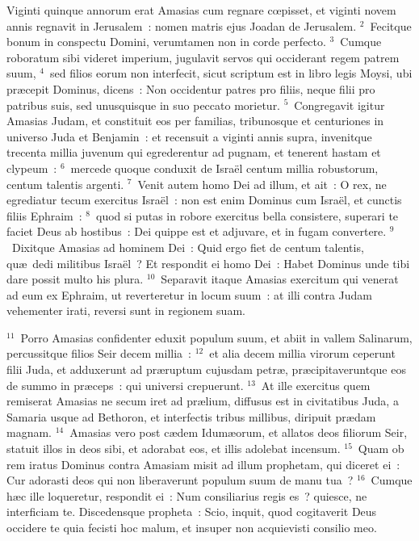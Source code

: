 \bchapter
\lettrine[lines=3,image=true,loversize=0.05,lraise=-0.03]{V}{}iginti quinque annorum erat Amasias cum regnare cœpisset, et viginti novem annis regnavit in Jerusalem~: nomen matris ejus Joadan de Jerusalem.
${}^{2}$~Fecitque bonum in conspectu Domini, verumtamen non in corde perfecto.
${}^{3}$~Cumque roboratum sibi videret imperium, jugulavit servos qui occiderant regem patrem suum,
${}^{4}$~sed filios eorum non interfecit, sicut scriptum est in libro legis Moysi, ubi pr\ae cepit Dominus, dicens~: Non occidentur patres pro filiis, neque filii pro patribus suis, sed unusquisque in suo peccato morietur.
${}^{5}$~Congregavit igitur Amasias Judam, et constituit eos per familias, tribunosque et centuriones in universo Juda et Benjamin~: et recensuit a viginti annis supra, invenitque trecenta millia juvenum qui egrederentur ad pugnam, et tenerent hastam et clypeum~:
${}^{6}$~mercede quoque conduxit de Isra\"el centum millia robustorum, centum talentis argenti.
${}^{7}$~Venit autem homo Dei ad illum, et ait~: O rex, ne egrediatur tecum exercitus Isra\"el~: non est enim Dominus cum Isra\"el, et cunctis filiis Ephraim~:
${}^{8}$~quod si putas in robore exercitus bella consistere, superari te faciet Deus ab hostibus~: Dei quippe est et adjuvare, et in fugam convertere.
${}^{9}$~Dixitque Amasias ad hominem Dei~: Quid ergo fiet de centum talentis, qu\ae\ dedi militibus Isra\"el~? Et respondit ei homo Dei~: Habet Dominus unde tibi dare possit multo his plura.
${}^{10}$~Separavit itaque Amasias exercitum qui venerat ad eum ex Ephraim, ut reverteretur in locum suum~: at illi contra Judam vehementer irati, reversi sunt in regionem suam.


${}^{11}$~Porro Amasias confidenter eduxit populum suum, et abiit in vallem Salinarum, percussitque filios Seir decem millia~:
${}^{12}$~et alia decem millia virorum ceperunt filii Juda, et adduxerunt ad pr\ae ruptum cujusdam petr\ae , pr\ae cipitaveruntque eos de summo in pr\ae ceps~: qui universi crepuerunt.
${}^{13}$~At ille exercitus quem remiserat Amasias ne secum iret ad pr\ae lium, diffusus est in civitatibus Juda, a Samaria usque ad Bethoron, et interfectis tribus millibus, diripuit pr\ae dam magnam.
${}^{14}$~Amasias vero post c\ae dem Idum\ae orum, et allatos deos filiorum Seir, statuit illos in deos sibi, et adorabat eos, et illis adolebat incensum.
${}^{15}$~Quam ob rem iratus Dominus contra Amasiam misit ad illum prophetam, qui diceret ei~: Cur adorasti deos qui non liberaverunt populum suum de manu tua~?
${}^{16}$~Cumque h\ae c ille loqueretur, respondit ei~: Num consiliarius regis es~? quiesce, ne interficiam te. Discedensque propheta~: Scio, inquit, quod cogitaverit Deus occidere te quia fecisti hoc malum, et insuper non acquievisti consilio meo.


